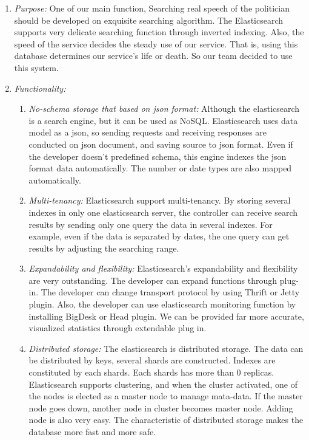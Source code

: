 \documentclass[conference]{IEEEtran}
\begin{document}
\begin{enumerate}
  \item \textit{Purpose: } One of our main function, Searching real speech of the politician should be developed on exquisite searching algorithm. The Elasticsearch supports very delicate searching function through inverted indexing. Also, the speed of the service decides the steady use of our service. That is, using this database determines our service’s life or death. So our team decided to use this system.\\
  \item \textit{Functionality: }
  \begin{enumerate}

\item \textit {No-schema storage that based on json format: }   Although the elasticsearch is a search engine, but it can be used as NoSQL. Elasticsearch uses data model as a json, so sending requests and receiving responses are conducted on json document, and saving source to json format. Even if the developer doesn’t predefined schema, this engine indexes the json format data automatically. The number or date types are also mapped automatically.\
 
\item \textit {Multi-tenancy: }Elasticsearch support multi-tenancy. By storing several indexes in only one elasticsearch server, the controller can receive search results by sending only one query the data in several indexes. For example, even if the data is separated by dates, the one query can get results by adjusting the searching range.\

\item \textit {Expandability and flexibility: }Elasticsearch’s expandability and flexibility are very outstanding. The developer can expand functions through plug-in. The developer can change transport protocol by using Thrift or Jetty plugin. Also, the developer can use elasticsearch monitoring function by installing BigDesk or Head plugin. We can be provided far more accurate, visualized statistics through extendable plug in.\

\item \textit {Distributed storage: }The elasticsearch is distributed storage. The data can be distributed by keys, several shards are constructed. Indexes are constituted by each shards. Each shards has more than 0 replicas. Elasticsearch supports clustering, and when the cluster activated, one of the nodes is elected as a master node to manage mata-data. If the master node goes down, another node in cluster becomes master node. Adding node is also very easy. The characteristic of distributed storage makes the database more fast and more safe.\


\end{enumerate}
\end{enumerate}
\end{document}
